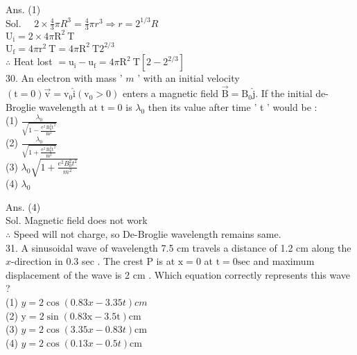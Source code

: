 \documentclass[10pt]{article}
\begin{document}
Ans. (1)\\
Sol. \(\quad 2 \times \frac{4}{3} \pi R^{3}=\frac{4}{3} \pi r^{3} \Rightarrow r=2^{1 / 3} R\)\\
\(\mathrm{U}_{\mathrm{i}}=2 \times 4 \pi \mathrm{R}^{2} \mathrm{~T}\)\\
\(\mathrm{U}_{\mathrm{f}}=4 \pi \mathrm{r}^{2} \mathrm{~T}=4 \pi \mathrm{R}^{2} \mathrm{~T} 2^{2 / 3}\)\\
\(\therefore\) Heat lost \(=\mathrm{u}_{\mathrm{i}}-\mathrm{u}_{\mathrm{f}}=4 \pi \mathrm{R}^{2} \mathrm{~T}\left[2-2^{2 / 3}\right]\)\\
30. An electron with mass ' \(m\) ' with an initial velocity \((\mathrm{t}=0) \overrightarrow{\mathrm{v}}=\mathrm{v}_{0} \hat{\mathrm{i}}\left(\mathrm{v}_{0}>0\right)\) enters a magnetic field \(\overrightarrow{\mathrm{B}}=\mathrm{B}_{0} \hat{\mathrm{j}}\). If the initial de-Broglie wavelength at \(\mathrm{t}=0\) is \(\lambda_{0}\) then its value after time ' t ' would be :\\
(1) \(\frac{\lambda_{0}}{\sqrt{1-\frac{\mathrm{e}^{2} \mathrm{~B}_{0}^{2} \mathrm{t}^{2}}{\mathrm{~m}^{2}}}}\)\\
(2) \(\frac{\lambda_{0}}{\sqrt{1+\frac{\mathrm{e}^{2} \mathrm{~B}_{0}^{2} \mathrm{t}^{2}}{\mathrm{~m}^{2}}}}\)\\
(3) \(\lambda_{0} \sqrt{1+\frac{e^{2} B_{0}^{2} t^{2}}{m^{2}}}\)\\
(4) \(\lambda_{0}\)

Ans. (4)\\
Sol. Magnetic field does not work\\
\(\therefore\) Speed will not charge, so De-Broglie wavelength remains same.\\
31. A sinusoidal wave of wavelength 7.5 cm travels a distance of 1.2 cm along the \(x\)-direction in 0.3 sec . The crest P is at \(\mathrm{x}=0\) at \(\mathrm{t}=0 \mathrm{sec}\) and maximum displacement of the wave is 2 cm . Which equation correctly represents this wave ?\\
(1) \(y=2 \cos (0.83 x-3.35 t) c m\)\\
(2) \(\mathrm{y}=2 \sin (0.83 \mathrm{x}-3.5 \mathrm{t}) \mathrm{cm}\)\\
(3) \(y=2 \cos (3.35 x-0.83 t) \mathrm{cm}\)\\
(4) \(y=2 \cos (0.13 x-0.5 t) \mathrm{cm}\)
\end{document}
